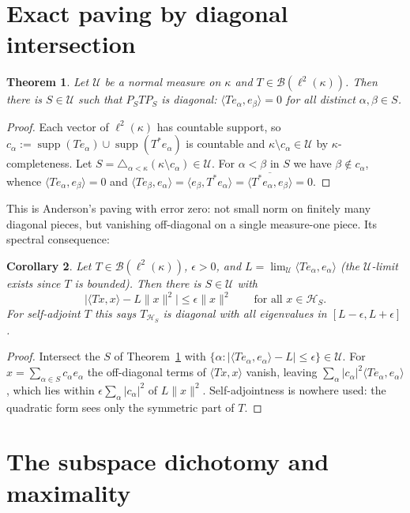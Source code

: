 \documentclass[11pt,reqno]{amsart}
\newtheorem{theorem}{Theorem}[section]
\newtheorem{corollary}[theorem]{Corollary}
\theoremstyle{definition}
\newcommand{\HH}{\mathcal{H}}
\newcommand{\U}{\mathcal{U}}
\newcommand{\supp}{\operatorname{supp}}
\newcommand{\lk}{\ell^2(\kappa)}
\newcommand{\Blk}{\mathcal{B}(\ell^2(\kappa))}
\begin{document}
\section{Exact paving by diagonal intersection}\label{sec:paving}

\begin{theorem}\label{thm:F}
Let $\U$ be a normal measure on $\kappa$ and $T\in\Blk$. Then there is $S\in\U$ such
that $P_STP_S$ is diagonal: $\langle Te_\alpha,e_\beta\rangle=0$ for all distinct
$\alpha,\beta\in S$.
\end{theorem}

\begin{proof}
Each vector of $\lk$ has countable support, so
$c_\alpha:=\supp(Te_\alpha)\cup\supp(T^*e_\alpha)$ is countable and
$\kappa\setminus c_\alpha\in\U$ by $\kappa$-completeness. Let
$S=\triangle_{\alpha<\kappa}(\kappa\setminus c_\alpha)\in\U$. For $\alpha<\beta$ in
$S$ we have $\beta\notin c_\alpha$, whence $\langle Te_\alpha,e_\beta\rangle=0$ and
$\langle Te_\beta,e_\alpha\rangle=\langle e_\beta,T^*e_\alpha\rangle
=\overline{\langle T^*e_\alpha,e_\beta\rangle}=0$.
\end{proof}

This is Anderson's paving \cite{Anderson79} with error zero: not small norm on
finitely many diagonal pieces, but vanishing off-diagonal on a single measure-one
piece. Its spectral consequence:

\begin{corollary}\label{cor:flat}
Let $T\in\Blk$, $\epsilon>0$, and
$L=\lim_{\U}\langle Te_\alpha,e_\alpha\rangle$ (the $\U$-limit exists since $T$ is
bounded). Then there is $S\in\U$ with
\[
\bigl|\langle Tx,x\rangle-L\|x\|^2\bigr|\le\epsilon\|x\|^2
\qquad\text{for all }x\in\HH_S .
\]
For self-adjoint $T$ this says $T_{\HH_S}$ is diagonal with all eigenvalues in
$[L-\epsilon,L+\epsilon]$.
\end{corollary}

\begin{proof}
Intersect the $S$ of Theorem~\ref{thm:F} with
$\{\alpha:|\langle Te_\alpha,e_\alpha\rangle-L|\le\epsilon\}\in\U$. For
$x=\sum_{\alpha\in S}c_\alpha e_\alpha$ the off-diagonal terms of
$\langle Tx,x\rangle$ vanish, leaving
$\sum_\alpha|c_\alpha|^2\langle Te_\alpha,e_\alpha\rangle$, which lies within
$\epsilon\sum_\alpha|c_\alpha|^2$ of $L\|x\|^2$. Self-adjointness is nowhere used:
the quadratic form sees only the symmetric part of $T$.
\end{proof}

\section{The subspace dichotomy and maximality}\label{sec:dichotomy}
\end{document}
